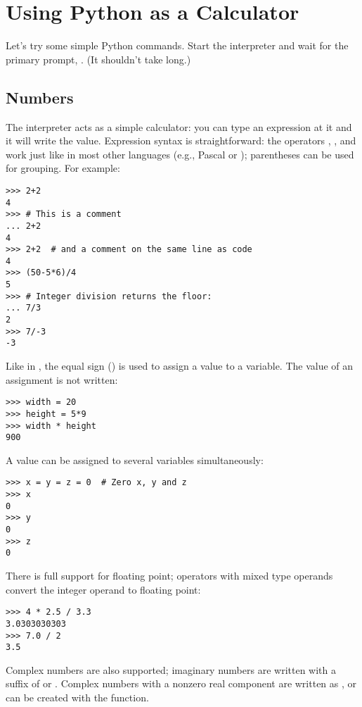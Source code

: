 \documentclass{manual}
\begin{document}
\section{Using Python as a Calculator}
\label{calculator}

Let's try some simple Python commands.  Start the interpreter and wait
for the primary prompt, \samp{>>> }.  (It shouldn't take long.)

\subsection{Numbers}
\label{numbers}

The interpreter acts as a simple calculator: you can type an
expression at it and it will write the value.  Expression syntax is
straightforward: the operators \code{+}, \code{-}, \code{*} and \code{/}
work just like in most other languages (e.g., Pascal or \C{}); parentheses
can be used for grouping.  For example:

\begin{verbatim}
>>> 2+2
4
>>> # This is a comment
... 2+2
4
>>> 2+2  # and a comment on the same line as code
4
>>> (50-5*6)/4
5
>>> # Integer division returns the floor:
... 7/3
2
>>> 7/-3
-3
\end{verbatim}

Like in \C{}, the equal sign (\character{=}) is used to assign a value to a
variable.  The value of an assignment is not written:

\begin{verbatim}
>>> width = 20
>>> height = 5*9
>>> width * height
900
\end{verbatim}
%
A value can be assigned to several variables simultaneously:

\begin{verbatim}
>>> x = y = z = 0  # Zero x, y and z
>>> x
0
>>> y
0
>>> z
0
\end{verbatim}
%
There is full support for floating point; operators with mixed type
operands convert the integer operand to floating point:

\begin{verbatim}
>>> 4 * 2.5 / 3.3
3.0303030303
>>> 7.0 / 2
3.5
\end{verbatim}
%
Complex numbers are also supported; imaginary numbers are written with
a suffix of  or .  Complex numbers with a nonzero
real component are written as , or can
be created with the  function.
\end{document}
